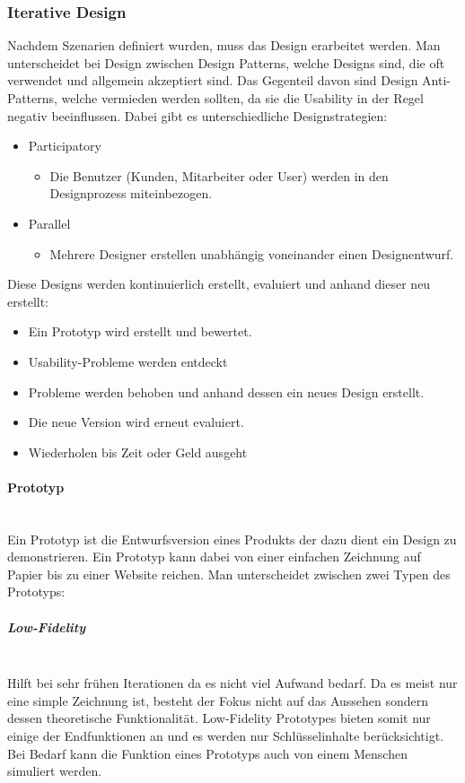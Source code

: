 \documentclass{article}
\newcommand{\paragraphlb}[1]{\paragraph{#1}\mbox{}\\}
\newcommand{\subparagraphlb}[1]{\subparagraph{#1}\mbox{}\\}
\begin{document}
	\subsubsection{Iterative Design}
	Nachdem Szenarien definiert wurden, muss das Design erarbeitet werden. Man unterscheidet bei Design zwischen Design Patterns, welche Designs sind, die oft verwendet und allgemein akzeptiert sind. Das Gegenteil davon sind Design Anti-Patterns, welche vermieden werden sollten, da sie die Usability in der Regel negativ beeinflussen. Dabei gibt es unterschiedliche Designstrategien:
	\begin{itemize}
		\item{Participatory}
		\begin{itemize}
			\item{Die Benutzer (Kunden, Mitarbeiter oder User) werden in den Designprozess miteinbezogen.}
		\end{itemize}
		\item{Parallel}
		\begin{itemize}
			\item{Mehrere Designer erstellen unabhängig voneinander einen Designentwurf.}
		\end{itemize}
	\end{itemize}
	Diese Designs werden kontinuierlich erstellt, evaluiert und anhand dieser neu erstellt:
	\begin{itemize}
		\item{Ein Prototyp wird erstellt und bewertet.}
		\item{Usability-Probleme werden entdeckt}
		\item{Probleme werden behoben und anhand dessen ein neues Design erstellt.}
		\item{Die neue Version wird erneut evaluiert.}
		\item{Wiederholen bis Zeit oder Geld ausgeht}
	\end{itemize}
	\paragraphlb{Prototyp}
	Ein Prototyp ist die Entwurfsversion eines Produkts der dazu dient ein Design zu demonstrieren. Ein Prototyp kann dabei von einer einfachen Zeichnung auf Papier bis zu einer Website reichen. Man unterscheidet zwischen zwei Typen des Prototyps:
	\subparagraphlb{Low-Fidelity}
	Hilft bei sehr frühen Iterationen da es nicht viel Aufwand bedarf. Da es meist nur eine simple Zeichnung ist, besteht der Fokus nicht auf das Aussehen sondern dessen theoretische Funktionalität. Low-Fidelity Prototypes bieten somit nur einige der Endfunktionen an und es werden nur Schlüsselinhalte berücksichtigt. Bei Bedarf kann die Funktion eines Prototyps auch von einem Menschen simuliert werden.
\end{document}
